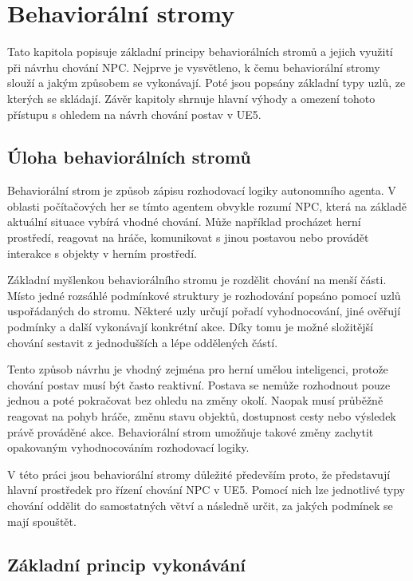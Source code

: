 \chapter{Behaviorální stromy}

Tato kapitola popisuje základní principy behaviorálních stromů a jejich využití při návrhu chování NPC. 
Nejprve je vysvětleno, k čemu behaviorální stromy slouží a jakým způsobem se vykonávají. 
Poté jsou popsány základní typy uzlů, ze kterých se skládají. 
Závěr kapitoly shrnuje hlavní výhody a omezení tohoto přístupu s ohledem na návrh chování postav v UE5.

\section{Úloha behaviorálních stromů}

Behaviorální strom je způsob zápisu rozhodovací logiky autonomního agenta. 
V oblasti počítačových her se tímto agentem obvykle rozumí NPC, která na základě aktuální situace vybírá vhodné chování. 
Může například procházet herní prostředí, reagovat na hráče, komunikovat s jinou postavou nebo provádět interakce s objekty v herním prostředí.

Základní myšlenkou behaviorálního stromu je rozdělit chování na menší části. 
Místo jedné rozsáhlé podmínkové struktury je rozhodování popsáno pomocí uzlů uspořádaných do stromu. 
Některé uzly určují pořadí vyhodnocování, jiné ověřují podmínky a další vykonávají konkrétní akce. 
Díky tomu je možné složitější chování sestavit z jednodušších a lépe oddělených částí.\cite[s.~6]{colledanchise2018}

Tento způsob návrhu je vhodný zejména pro herní umělou inteligenci, protože chování postav musí být často reaktivní. 
Postava se nemůže rozhodnout pouze jednou a poté pokračovat bez ohledu na změny okolí. 
Naopak musí průběžně reagovat na pohyb hráče, změnu stavu objektů, dostupnost cesty nebo výsledek právě prováděné akce. 
Behaviorální strom umožňuje takové změny zachytit opakovaným vyhodnocováním rozhodovací logiky.\cite[s.~5]{colledanchise2018}

V této práci jsou behaviorální stromy důležité především proto, že představují hlavní prostředek pro řízení chování NPC v UE5. 
Pomocí nich lze jednotlivé typy chování oddělit do samostatných větví a následně určit, za jakých podmínek se mají spouštět.

\section{Základní princip vykonávání}

